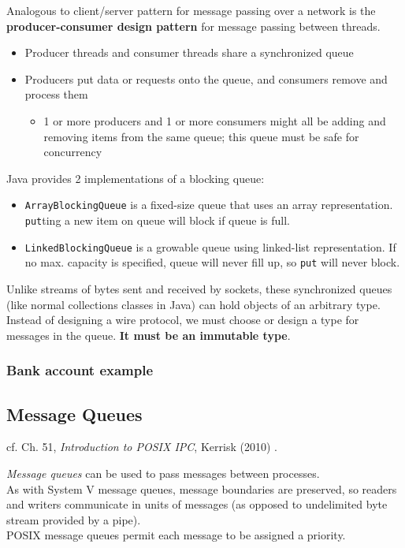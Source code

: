 \documentclass[10pt]{amsart}
\begin{document}
Analogous to client/server pattern for message passing over a network is the \textbf{producer-consumer design pattern} for message passing between threads. 
\begin{itemize} 
	\item Producer threads and consumer threads share a synchronized queue
	\item Producers put data or requests onto the queue, and consumers remove and process them
	\begin{itemize}
		\item 1 or more producers and 1 or more consumers might all be adding and removing items from the same queue; this queue must be safe for concurrency
	\end{itemize}
\end{itemize} 

Java provides 2 implementations of a blocking queue:
\begin{itemize}
	\item \verb|ArrayBlockingQueue| is a fixed-size queue that uses an array representation. \verb|put|ting a new item on queue will block if queue is full.
	\item \verb|LinkedBlockingQueue| is a growable queue using linked-list representation. If no max. capacity is specified, queue will never fill up, so \verb|put| will never block.
\end{itemize}

Unlike streams of bytes sent and received by sockets, these synchronized queues (like normal collections classes in Java) can hold objects of an arbitrary type. Instead of designing a wire protocol, we must choose or design a type for messages in the queue. \textbf{It must be an immutable type}. 


\subsubsection{Bank account example}

\subsection{Message Queues}

cf. Ch. 51, \emph{Introduction to POSIX IPC}, Kerrisk (2010) \cite{Kerr2010}.

\emph{Message queues} can be used to pass messages between processes. \\
As with System V message queues, message boundaries are preserved, so readers and writers communicate in units of messages (as opposed to undelimited byte stream provided by a pipe). \\
POSIX message queues permit each message to be assigned a priority.
\end{document}
